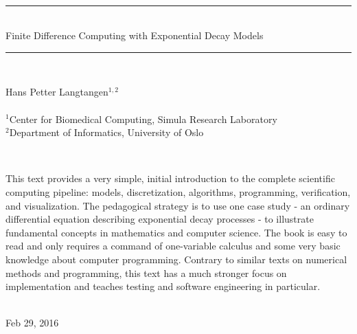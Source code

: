 \documentclass[graybox,sectrefs,envcountresetchap,open=right,final]{svmonodo}
\begin{document}





\frontmatter
\setcounter{page}{3}
\pagestyle{headings}



\thispagestyle{empty}
\hbox{\ \ }
\vfill
\begin{center}
{\huge{\bfseries{
\begin{spacing}{1.25}
{\rule{\linewidth}{0.5mm}} \\[0.4cm]
{Finite Difference Computing with Exponential Decay Models}
\\[0.4cm] {\rule{\linewidth}{0.5mm}} \\[1.5cm]
\end{spacing}
}}}


\vspace{0.5cm}

{\Large\textsf{Hans Petter Langtangen${}^{1, 2}$}}\\ [3mm]

\ \\ [2mm]

{\large\textsf{${}^1$Center for Biomedical Computing, Simula Research Laboratory} \\ [1.5mm]}
{\large\textsf{${}^2$Department of Informatics, University of Oslo} \\ [1.5mm]}

\ \\ [13mm]
\begin{center}
\begin{minipage}{0.9\linewidth}
\small
This text provides a very simple, initial introduction to the complete
scientific computing pipeline: models, discretization, algorithms,
programming, verification, and visualization. The pedagogical strategy
is to use one case study - an ordinary differential equation
describing exponential decay processes - to illustrate fundamental
concepts in mathematics and computer science. The book is easy to read
and only requires a command of one-variable calculus and some very
basic knowledge about computer programming. Contrary to similar texts
on numerical methods and programming, this text has a much stronger
focus on implementation and teaches testing and software engineering
in particular.
\end{minipage}
\end{center}

\ \\ [10mm]
{\large\textsf{Feb 29, 2016}}

\end{center}
\end{document}
